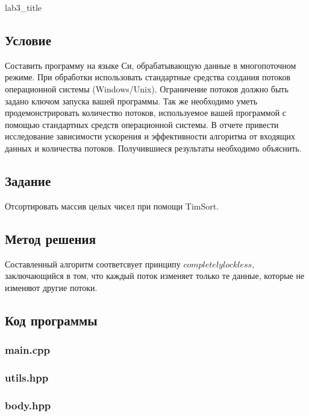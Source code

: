 \documentclass[12pt]{article}
\begin{document}
	
	{lab3_title}
	
	\subsection*{Условие}
	
	Составить программу на языке Си, обрабатывающую данные в многопоточном режиме. При 
	обработки использовать стандартные средства создания потоков операционной системы 
	(Windows/Unix). Ограничение потоков должно быть задано ключом запуска вашей программы.
	Так же необходимо уметь продемонстрировать количество потоков, используемое вашей 
	программой с помощью стандартных средств операционной системы.
	В отчете привести исследование зависимости ускорения и эффективности алгоритма от входящих 
	данных и количества потоков. Получившиеся результаты необходимо объяснить.
	
	\subsection*{Задание}
	
	Отсортировать массив целых чисел при помощи TimSort.
	
	\subsection*{Метод решения}
	
	Составленный алгоритм соответсвует принципу $completely lockless$, заключающийся в том, что каждый поток изменяет только те данные, которые не изменяют другие потоки.
	
	\subsection*{Код программы}
	
	\subsubsection*{main.cpp}
	
	
	
	\subsubsection*{utils.hpp}
	
	
	
	\subsubsection*{body.hpp}
	
\end{document}
